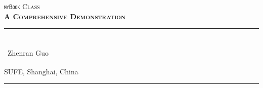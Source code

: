
\begin{titlepage}
    \colorbox{black!5}{%
        \parbox[t]{0.975\textwidth}{%
            \parbox[t]{0.95\textwidth}{%
                \raggedleft\vspace{0.75cm}\Huge\scshape
                \texttt{myBook} Class \\[7.5pt]
                \large\bfseries A Comprehensive Demonstration
                \vspace{0.75cm}%
            }%
        }%
    }%

    \vfill

    \parbox[t]{0.95\textwidth}{%
        \hfill\rule{0.15\linewidth}{0.5pt}\\[7.5pt]
        \raggedleft
        \textcopyright\ Zhenran Guo\textsuperscript{\textdagger}%
        
        \normalsize\textsuperscript{\textdagger} SUFE, Shanghai, China\\[10pt]
        
        \hfill\rule{0.15\linewidth}{0.5pt}%
    }%
\end{titlepage}
